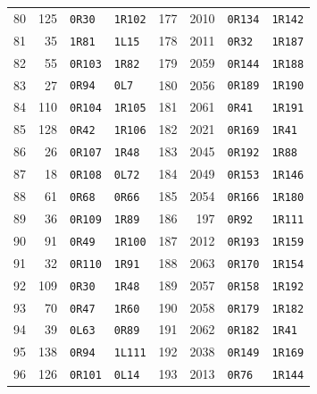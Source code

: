 \begin{longtable}{rrll@{\qquad}rrll}
80 & 125 & \texttt{0R30} & \texttt{1R102} & 177 & 2010 & \texttt{0R134} & \texttt{1R142}\\
81 & 35 & \texttt{1R81} & \texttt{1L15} & 178 & 2011 & \texttt{0R32} & \texttt{1R187}\\
82 & 55 & \texttt{0R103} & \texttt{1R82} & 179 & 2059 & \texttt{0R144} & \texttt{1R188}\\
83 & 27 & \texttt{0R94} & \texttt{0L7} & 180 & 2056 & \texttt{0R189} & \texttt{1R190}\\
84 & 110 & \texttt{0R104} & \texttt{1R105} & 181 & 2061 & \texttt{0R41} & \texttt{1R191}\\
85 & 128 & \texttt{0R42} & \texttt{1R106} & 182 & 2021 & \texttt{0R169} & \texttt{1R41}\\
86 & 26 & \texttt{0R107} & \texttt{1R48} & 183 & 2045 & \texttt{0R192} & \texttt{1R88}\\
87 & 18 & \texttt{0R108} & \texttt{0L72} & 184 & 2049 & \texttt{0R153} & \texttt{1R146}\\
88 & 61 & \texttt{0R68} & \texttt{0R66} & 185 & 2054 & \texttt{0R166} & \texttt{1R180}\\
89 & 36 & \texttt{0R109} & \texttt{1R89} & 186 & 197 & \texttt{0R92} & \texttt{1R111}\\
90 & 91 & \texttt{0R49} & \texttt{1R100} & 187 & 2012 & \texttt{0R193} & \texttt{1R159}\\
91 & 32 & \texttt{0R110} & \texttt{1R91} & 188 & 2063 & \texttt{0R170} & \texttt{1R154}\\
92 & 109 & \texttt{0R30} & \texttt{1R48} & 189 & 2057 & \texttt{0R158} & \texttt{1R192}\\
93 & 70 & \texttt{0R47} & \texttt{1R60} & 190 & 2058 & \texttt{0R179} & \texttt{1R182}\\
94 & 39 & \texttt{0L63} & \texttt{0R89} & 191 & 2062 & \texttt{0R182} & \texttt{1R41}\\
95 & 138 & \texttt{0R94} & \texttt{1L111} & 192 & 2038 & \texttt{0R149} & \texttt{1R169}\\
96 & 126 & \texttt{0R101} & \texttt{0L14} & 193 & 2013 & \texttt{0R76} & \texttt{1R144}\\
\end{longtable}\endgroup
